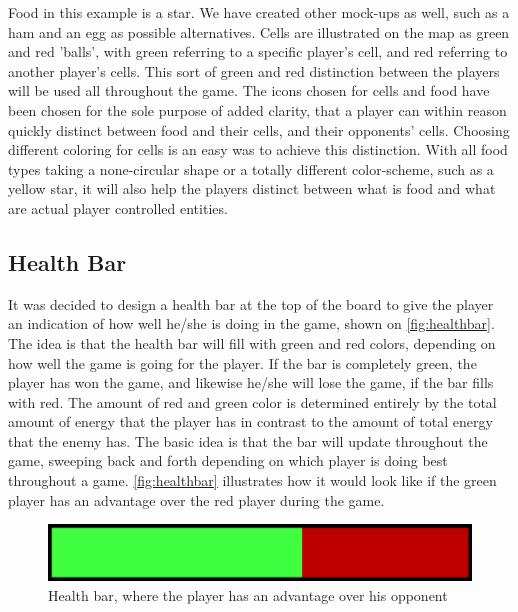 Food in this example is a star.
We have created other mock-ups as well, such as a ham and an egg as possible alternatives. 
Cells are illustrated on the map as green and red 'balls', with green referring to a specific player's cell, and red referring to another player's cells.
This sort of green and red distinction between the players will be used all throughout the game.
The icons chosen for cells and food have been chosen for the sole purpose of added clarity, that a player can within reason quickly distinct between food and their cells, and their opponents' cells.
Choosing different coloring for cells is an easy was to achieve this distinction.
With all food types taking a none-circular shape or a totally different color-scheme, such as a yellow star, it will also help the players distinct between what is food and what are actual player controlled entities.

\subsection{Health Bar}
It was decided to design a health bar at the top of the board to give the player an indication of how well he/she is doing in the game, shown on \autoref{fig:healthbar}.
The idea is that the health bar will fill with green and red colors, depending on how well the game is going for the player.
If the bar is completely green, the player has won the game, and likewise he/she will lose the game, if the bar fills with red.
The amount of red and green color is determined entirely by the total amount of energy that the player has in contrast to the amount of total energy that the enemy has.
The basic idea is that the bar will update throughout the game, sweeping back and forth depending on which player is doing best throughout a game.
\autoref{fig:healthbar} illustrates how it would look like if the green player has an advantage over the red player during the game.

\begin{figure}[h]
	\centering
		\includegraphics{img/healthbar_example.png}
	\caption{Health bar, where the player has an advantage over his opponent}
	\label{fig:healthbar}
\end{figure}


